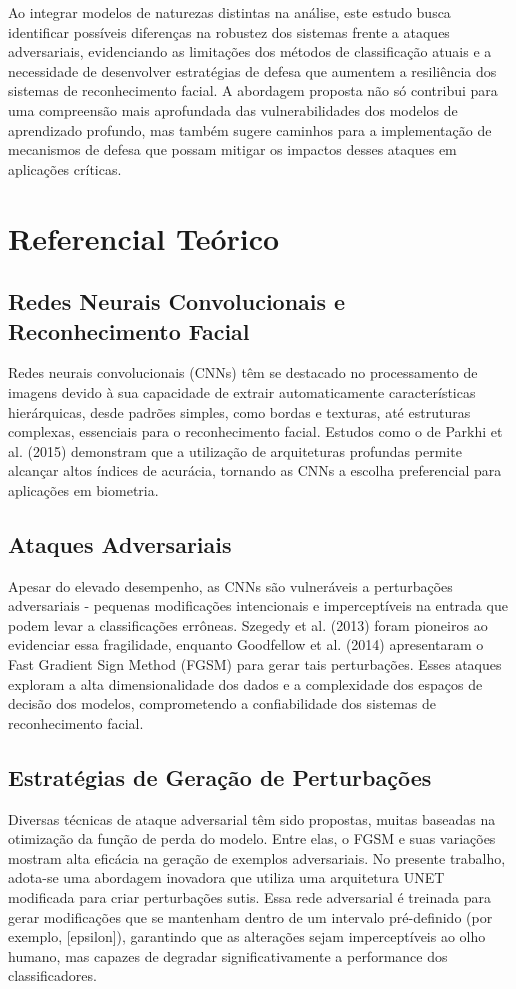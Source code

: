 \documentclass[12pt]{article}
\begin{document}
Ao integrar modelos de naturezas distintas na análise, este estudo busca
identificar possíveis diferenças na robustez dos sistemas frente a ataques
adversariais, evidenciando as limitações dos métodos de classificação atuais e
a necessidade de desenvolver estratégias de defesa que aumentem a resiliência
dos sistemas de reconhecimento facial. A abordagem proposta não só contribui
para uma compreensão mais aprofundada das vulnerabilidades dos modelos de
aprendizado profundo, mas também sugere caminhos para a implementação de
mecanismos de defesa que possam mitigar os impactos desses ataques em
aplicações críticas.

\section{Referencial Teórico}
\subsection{Redes Neurais Convolucionais e Reconhecimento Facial}
Redes neurais convolucionais (CNNs) têm se destacado no processamento de
imagens devido à sua capacidade de extrair automaticamente características
hierárquicas, desde padrões simples, como bordas e texturas, até estruturas
complexas, essenciais para o reconhecimento facial. Estudos como o de Parkhi et
al. (2015) demonstram que a utilização de arquiteturas profundas permite
alcançar altos índices de acurácia, tornando as CNNs a escolha preferencial
para aplicações em biometria.

\subsection{Ataques Adversariais}
Apesar do elevado desempenho, as CNNs são vulneráveis a perturbações
adversariais - pequenas modificações intencionais e imperceptíveis na entrada
que podem levar a classificações errôneas. Szegedy et al. (2013) foram
pioneiros ao evidenciar essa fragilidade, enquanto Goodfellow et al. (2014)
apresentaram o Fast Gradient Sign Method (FGSM) para gerar tais perturbações.
Esses ataques exploram a alta dimensionalidade dos dados e a complexidade dos
espaços de decisão dos modelos, comprometendo a confiabilidade dos sistemas de
reconhecimento facial.

\subsection{Estratégias de Geração de Perturbações}
Diversas técnicas de ataque adversarial têm sido propostas, muitas baseadas na
otimização da função de perda do modelo. Entre elas, o FGSM e suas variações
mostram alta eficácia na geração de exemplos adversariais. No presente
trabalho, adota-se uma abordagem inovadora que utiliza uma arquitetura UNET
modificada para criar perturbações sutis. Essa rede adversarial é treinada para
gerar modificações que se mantenham dentro de um intervalo pré-definido (por
exemplo, [epsilon]), garantindo que as alterações sejam imperceptíveis ao olho
humano, mas capazes de degradar significativamente a performance dos
classificadores.
\end{document}
